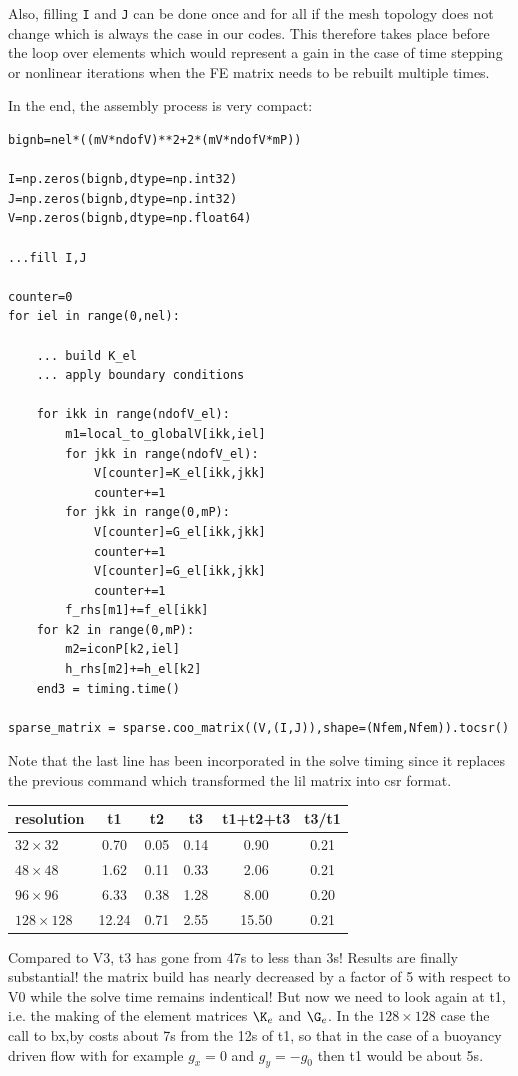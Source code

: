 Also, filling {\tt I} and {\tt J} can be done once and for all if the 
mesh topology does not change
which is always the case in our codes. This therefore takes place before the loop over 
elements which would represent a gain in the case of time stepping or nonlinear iterations
when the FE matrix needs to be rebuilt multiple times.

In the end, the assembly process is very compact:
\begin{lstlisting}
bignb=nel*((mV*ndofV)**2+2*(mV*ndofV*mP))

I=np.zeros(bignb,dtype=np.int32)    
J=np.zeros(bignb,dtype=np.int32)    
V=np.zeros(bignb,dtype=np.float64)    

...fill I,J

counter=0
for iel in range(0,nel):

    ... build K_el
    ... apply boundary conditions

    for ikk in range(ndofV_el):
        m1=local_to_globalV[ikk,iel]
        for jkk in range(ndofV_el):
            V[counter]=K_el[ikk,jkk]
            counter+=1
        for jkk in range(0,mP):
            V[counter]=G_el[ikk,jkk]
            counter+=1
            V[counter]=G_el[ikk,jkk]
            counter+=1
        f_rhs[m1]+=f_el[ikk]
    for k2 in range(0,mP):
        m2=iconP[k2,iel]
        h_rhs[m2]+=h_el[k2]
    end3 = timing.time()

sparse_matrix = sparse.coo_matrix((V,(I,J)),shape=(Nfem,Nfem)).tocsr()
\end{lstlisting}

Note that the last line has been incorporated in the solve timing 
since it replaces the previous command which 
transformed the lil matrix into csr format.

\begin{center}
\begin{tabular}{lccccc}
\hline
resolution & t1 & t2 & t3 & t1+t2+t3 & t3/t1\\ 
\hline
\hline
$32\times 32$   &  0.70 & 0.05 & 0.14 &  0.90 & 0.21 \\
$48\times 48$   &  1.62 & 0.11 & 0.33 &  2.06 & 0.21 \\
$96\times 96$   &  6.33 & 0.38 & 1.28 &  8.00 & 0.20 \\
$128\times 128$ & 12.24 & 0.71 & 2.55 & 15.50 & 0.21 \\
\hline
\end{tabular}
\end{center}

Compared to V3, t3 has gone from 47s to less than 3s!
Results are finally substantial! the matrix build 
has nearly decreased by a factor of 5 with respect to V0
while the solve time remains indentical!
But now we need to look again at t1, i.e. the making of the 
element matrices $\K_e$ and $\G_e$. In the $128\times 128$ case the call to bx,by 
costs about 7s from the 12s of t1, so that in the case of a buoyancy 
driven flow with for example $g_x=0$ and $g_y=-g_0$ then t1 would be 
about 5s. 

